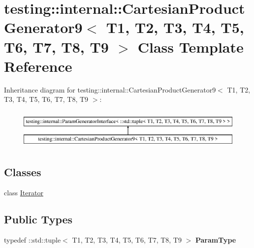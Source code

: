 \hypertarget{classtesting_1_1internal_1_1_cartesian_product_generator9}{}\section{testing\+:\+:internal\+:\+:Cartesian\+Product\+Generator9$<$ T1, T2, T3, T4, T5, T6, T7, T8, T9 $>$ Class Template Reference}
\label{classtesting_1_1internal_1_1_cartesian_product_generator9}
Inheritance diagram for testing\+:\+:internal\+:\+:Cartesian\+Product\+Generator9$<$ T1, T2, T3, T4, T5, T6, T7, T8, T9 $>$\+:\begin{figure}[H]
\begin{center}
\leavevmode
\includegraphics[height=2.000000cm]{classtesting_1_1internal_1_1_cartesian_product_generator9}
\end{center}
\end{figure}
\subsection*{Classes}
\begin{DoxyCompactItemize}
\item 
class \mbox{\hyperlink{classtesting_1_1internal_1_1_cartesian_product_generator9_1_1_iterator}{Iterator}}
\end{DoxyCompactItemize}
\subsection*{Public Types}
\begin{DoxyCompactItemize}
\item 
\mbox{\label{classtesting_1_1internal_1_1_cartesian_product_generator9_a86742cdf8f015ff11f7a40f0b66179c7}} 
typedef \+::std\+::tuple$<$ T1, T2, T3, T4, T5, T6, T7, T8, T9 $>$ {\bfseries Param\+Type}
\end{DoxyCompactItemize}
